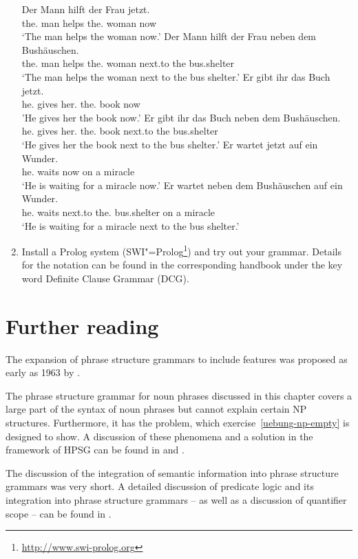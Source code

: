 \begin{enumerate}
\eal
\ex 
\gll Der Mann hilft der Frau jetzt.\\
     the.\nom{} man helps the.\dat{} woman now\\
\glt `The man helps the woman now.'
\ex 
\gll Der Mann hilft der Frau neben dem Bushäuschen.\\
     the.\nom{} man helps the.\dat{} woman next.to the bus.shelter\\
\glt `The man helps the woman next to the bus shelter.'
\ex 
\gll Er gibt ihr das Buch jetzt.\\
     he.\nom{} gives her.\dat{} the.\acc{} book now\\
\glt 'He gives her the book now.'
\ex 
\gll Er gibt ihr das Buch neben dem Bushäuschen.\\
     he.\nom{} gives her.\dat{} the.\acc{} book next.to the bus.shelter\\
\glt `He gives her the book next to the bus shelter.'
\ex 
\gll Er wartet jetzt auf ein Wunder.\\
     he.\nom{} waits now on a miracle\\
\glt `He is waiting for a miracle now.'
\ex 
\gll Er wartet neben dem Bushäuschen auf ein Wunder.\\
     he.\nom{} waits next.to the.\dat{} bus.shelter on a miracle\\
\glt `He is waiting for a miracle next to the bus shelter.'
\zl
\item Install a Prolog system (\eg SWI"=Prolog\footnote{
\url{http://www.swi-prolog.org} 
})
and try out your grammar. Details for the notation can be found in the corresponding handbook
under the key word Definite Clause Grammar (DCG).
\end{enumerate}


\section*{Further reading}

The expansion of phrase structure grammars to include features was proposed as early as 1963 by \citet{Harman63a}.

The phrase structure grammar for noun phrases discussed in this chapter covers a large part of the syntax
of noun phrases but cannot explain certain NP structures. Furthermore, it has the problem, which exercise~\ref{uebung-np-empty}
is designed to show. A discussion of these phenomena and a solution in the framework of HPSG can be found in  and .

The discussion of the integration of semantic information into phrase structure grammars was very short. A detailed discussion of predicate logic and
its integration into phrase structure grammars -- as well as a discussion of quantifier scope -- can be found in . 



